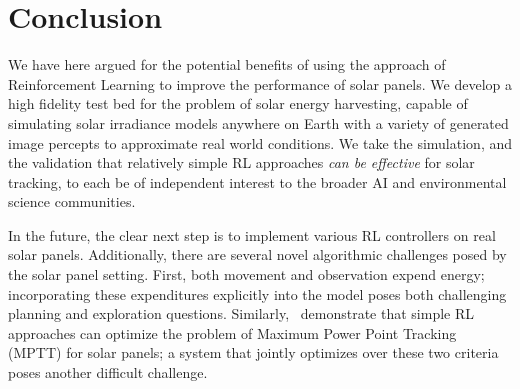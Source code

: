 \documentclass{article}
\begin{document}
\section{Conclusion}

We have here argued for the potential benefits of using the approach of Reinforcement Learning to improve the performance of solar panels. We develop a high fidelity test bed for the problem of solar energy harvesting, capable of simulating solar irradiance models anywhere on Earth with a variety of generated image percepts to approximate real world conditions. We take the simulation, and the validation that relatively simple RL approaches {\it can be effective} for solar tracking, to each be of independent interest to the broader AI and environmental science communities.

In the future, the clear next step is to implement various RL controllers on real solar panels. Additionally, there are several novel algorithmic challenges posed by the solar panel setting. First, both movement and observation expend energy; incorporating these expenditures explicitly into the model poses both challenging planning and exploration questions. Similarly,~\citet{Hsu2015} demonstrate that simple RL approaches can optimize the problem of Maximum Power Point Tracking (MPTT) for solar panels; a system that jointly optimizes over these two criteria poses another difficult challenge.







\end{document}

